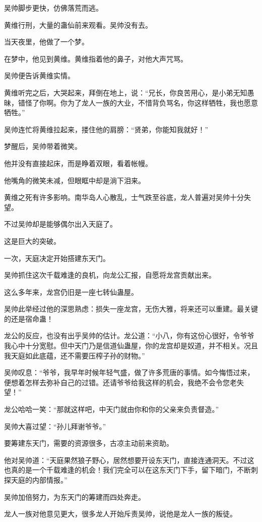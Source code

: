 \begin{this_body}
吴帅脚步更快，仿佛落荒而逃。

黄维行刑，大量的蛊仙前来观看。吴帅没有去。

当天夜里，他做了一个梦。

在梦中，他见到黄维。黄维指着他的鼻子，对他大声咒骂。

吴帅便告诉黄维实情。

黄维听完之后，大哭起来，拜倒在地上，说：“兄长，你良苦用心，是小弟无知愚昧，错怪了你啊。你为了龙人一族的大业，不惜背负骂名，你这样牺牲，我也愿意牺牲。”

吴帅连忙将黄维拉起来，搂住他的肩膀：“贤弟，你能知我就好！”

梦醒后，吴帅带着微笑。

他并没有直接起床，而是睁着双眼，看着帐幔。

他嘴角的微笑未减，但眼眶中却是淌下泪来。

黄维之死有许多影响。南华岛人心散乱，士气跌至谷底，龙人普遍对吴帅十分失望。

不过吴帅却是能够偶尔出入天庭了。

这是巨大的突破。

一次，天庭决定开始搭建东天门。

吴帅抓住这次千载难逢的良机，向龙公汇报，自愿将龙宫贡献出来。

这么多年来，龙宫仍旧是一座七转仙蛊屋。

吴帅此举经过他的深思熟虑：损失一座龙宫，无伤大雅，将来还可以重建。最关键的还是宿命蛊！

龙公的反应，也没有出乎吴帅的估计。龙公道：“小八，你有这份心很好，令爷爷我心中十分宽慰。但中天门乃是信道仙蛊屋，你的龙宫却是奴道，并不相关。况且我天庭如此底蕴，还不需要压榨子孙的财物。”

吴帅叹息：“爷爷，我早年时候年轻气盛，做了许多荒唐的事情。如今悔悟过来，便想着怎样去弥补自己的过错。还请爷爷给我这样的机会，我绝不会令您老失望！”

龙公哈哈一笑：“那就这样吧，中天门就由你和你的父亲来负责督造。”

吴帅大喜过望：“孙儿拜谢爷爷。”

要筹建东天门，需要的资源很多，古凉主动前来资助。

他对吴帅道：“天庭果然狼子野心，居然想要开设东天门，直接连通洞天。不过这也真的是一个千载难逢的机会！我们完全可以在这东天门下手，留下暗门，不断刺探天庭的内部情报。”

吴帅加倍努力，为东天门的筹建而四处奔走。

龙人一族对他意见更大，很多龙人开始斥责吴帅，说他是龙人一族的叛徒。


\end{this_body}
